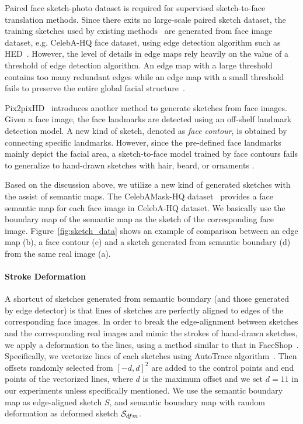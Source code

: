 

Paired face sketch-photo dataset is required for supervised sketch-to-face translation methods.
Since there exits no large-scale paired sketch dataset, the training sketches used by existing methods~\cite{pix2pix, Lines2Face} are generated from face image dataset, e.g. CelebA-HQ face dataset, using edge detection algorithm such as HED~\cite{HED}.
%
However, the level of details in edge maps rely heavily on the value of a threshold of edge detection algorithm. An edge map with a large threshold contains too many redundant edges while an edge map with a small threshold fails to preserve the entire global facial structure~\cite{Lines2Face}.

Pix2pixHD~\cite{pix2pixHD} introduces another method to generate sketches from face images. Given a face image, the face landmarks are detected using an off-shelf landmark detection model. A new kind of sketch, denoted as \textit{face contour}, is obtained by connecting specific landmarks. However, since the pre-defined face landmarks mainly depict the facial area,  a sketch-to-face model trained by face contours fails to generalize to hand-drawn sketches with hair, beard, or ornaments . 

Based on the discussion above, we utilize a new kind of generated sketches with the assist of semantic maps.
The CelebAMask-HQ dataset~\cite{CelebAMask-HQ} provides a face semantic map for each face image in CelebA-HQ dataset. We basically use the boundary map of the semantic map as the sketch of the corresponding face image. Figure~\ref{fig:sketch_data} shows an example of comparison between an edge map (b), a face contour (c) and a sketch generated from semantic boundary (d) from the same real image (a).
%


\paragraph{Stroke Deformation}
A shortcut of sketches generated from semantic boundary (and those generated by edge detector) is that lines of sketches are perfectly aligned to edges of the corresponding face images. In order to break the edge-alignment between sketches and the corresponding real images and mimic the strokes of hand-drawn sketches, we apply a deformation to the lines, using a method similar to that in FaceShop~\cite{Faceshop-Portenier-TOG18}. Specifically, we vectorize lines of each sketches using AutoTrace algorithm~\cite{AutoTrace}. Then offsets randomly selected from $[-d, d]^2$ are added to the control points and end points of the vectorized lines, where $d$ is the maximum offset and we set $d=11$ in our experiments unless specifically mentioned.
%
We use the semantic boundary map as edge-aligned sketch $S$, and semantic boundary map with random deformation as deformed sketch $\mathcal{S}_{dfm}$.

